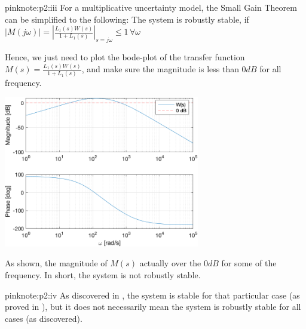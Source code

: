 \documentclass{tron}
\begin{document}
	\begin{note}{pink}{note:p2:iii}
		For a multiplicative uncertainty model, the Small Gain Theorem can be simplified to the following:
			\qquad The system is robustly stable, if $|M(j\omega)| = |\frac{L_1(s) W(s)}{1 + L_1(s)}|_{s=j\omega} \leq 1 \, \forall \omega$
			
		Hence, we just need to plot the bode-plot of the transfer function $M(s) = \frac{L_1(s) W(s)}{1 + L_1(s)}$, and make sure the magnitude is less than $0\unit{dB}$ for all frequency.
		
		{	
			\centering
			\includegraphics[height=250px]{../matlab/output/q2/c-iii}
		}	
		
		As  shown, the magnitude of $M(s)$ actually over the $0 \unit{dB}$ for some of the frequency. In short, the system is not robustly stable.
	\end{note}

	\begin{note}{pink}{note:p2:iv}
		As discovered in , the system is stable for that particular case (as proved in ), but it does not necessarily mean the system is robustly stable for all cases (as  discovered). 
	\end{note}






\end{document}
